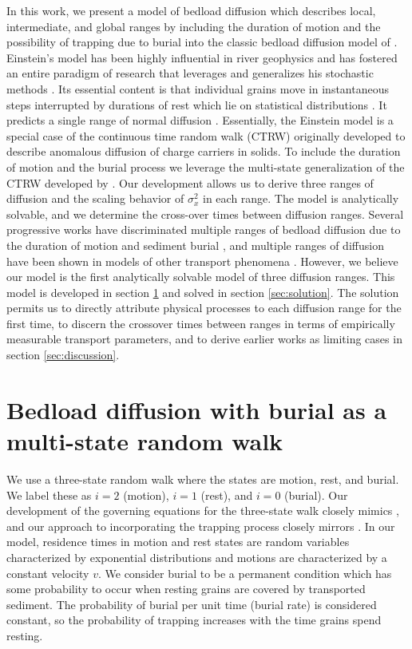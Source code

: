 \documentclass[]{agujournal2018}
\begin{document}
In this work, we present a model of bedload diffusion which describes local, intermediate, and global ranges by including the duration of motion and the possibility of trapping due to burial into the classic bedload diffusion model of \citet{Einstein1937}.
Einstein's model has been highly influential in river geophysics and has fostered an entire paradigm of research that leverages and generalizes his stochastic methods \citep[e.g.][]{Hubbell1964, Yano1969, Yang1971, Gordon1972, Nakagawa1976}.
Its essential content is that individual grains move in instantaneous steps interrupted by durations of rest which lie on statistical distributions \citep{Hassan1991}.
It predicts a single range of normal diffusion \citep{Einstein1937, Nakagawa1976}.
Essentially, the Einstein model is a special case of the continuous time random walk (CTRW) \citep{Montroll1965} originally developed to describe anomalous diffusion of charge carriers in solids.
To include the duration of motion and the burial process we leverage the multi-state generalization of the CTRW developed by \citet{Weiss1976, Weiss1994}.
Our development allows us to derive three ranges of diffusion and the scaling behavior of $\sigma_x^2$ in each range. The model is analytically solvable, and we determine the cross-over times between diffusion ranges.
Several progressive works have discriminated multiple ranges of bedload diffusion due to the duration of motion \citep{Lisle1998} and sediment burial \citep{Wu2019}, and multiple ranges of diffusion have been shown in models of other transport phenomena \cite[e.g.][]{Bena2006, Balakrishnan1988, Flekkøy2017, AaraoReis2014}.
However, we believe our model is the first analytically solvable model of three diffusion ranges.
This model is developed in section \ref{sec:model} and solved in section \ref{sec:solution}.
The solution permits us to directly attribute physical processes to each diffusion range for the first time, to discern the crossover times between ranges in terms of empirically measurable transport parameters, and to derive earlier works as limiting cases \citep[e.g.][]{Lisle1998,Wu2019,Einstein1937} in section \ref{sec:discussion}.

\section{Bedload diffusion with burial as a multi-state random walk}
\label{sec:model}
We use a three-state random walk where the states are motion, rest, and burial.
We label these as $i=2$ (motion), $i=1$ (rest), and $i=0$ (burial).
Our development of the governing equations for the three-state walk closely mimics \citet{Weiss1994}, and our approach to incorporating the trapping process closely mirrors \citet{Schmidt2007}. 
In our model, residence times in motion and rest states are random variables characterized by exponential distributions and motions are characterized by a constant velocity $v$.
We consider burial to be a permanent condition which has some probability to occur when resting grains are covered by transported sediment.
The probability of burial per unit time (burial rate) is considered constant, so the probability of trapping increases with the time grains spend resting.
\end{document}
